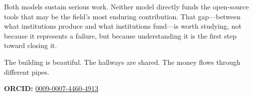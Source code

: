\documentclass[10pt,letterpaper,twocolumn]{article}
\begin{document}
Both models sustain serious work. Neither model directly funds the open-source tools that may be the field's most enduring contribution. That gap---between what institutions produce and what institutions fund---is worth studying, not because it represents a failure, but because understanding it is the first step toward closing it.

The building is beautiful. The hallways are shared. The money flows through different pipes.

\vspace{0.5em}
\noindent\textbf{ORCID:} \href{https://orcid.org/0009-0007-4460-4913}{0009-0007-4460-4913}



\end{document}
